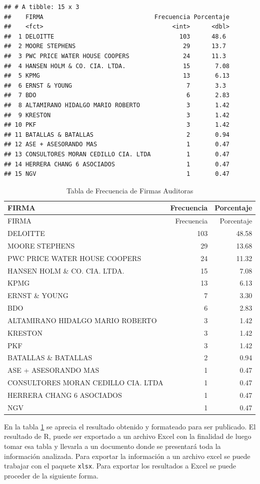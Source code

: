 \documentclass[]{book}
\begin{document}
\begin{verbatim}
## # A tibble: 15 x 3
##    FIRMA                               Frecuencia Porcentaje
##    <fct>                                    <int>      <dbl>
##  1 DELOITTE                                   103      48.6 
##  2 MOORE STEPHENS                              29      13.7 
##  3 PWC PRICE WATER HOUSE COOPERS               24      11.3 
##  4 HANSEN HOLM & CO. CIA. LTDA.                15       7.08
##  5 KPMG                                        13       6.13
##  6 ERNST & YOUNG                                7       3.3 
##  7 BDO                                          6       2.83
##  8 ALTAMIRANO HIDALGO MARIO ROBERTO             3       1.42
##  9 KRESTON                                      3       1.42
## 10 PKF                                          3       1.42
## 11 BATALLAS & BATALLAS                          2       0.94
## 12 ASE + ASESORANDO MAS                         1       0.47
## 13 CONSULTORES MORAN CEDILLO CIA. LTDA          1       0.47
## 14 HERRERA CHANG 6 ASOCIADOS                    1       0.47
## 15 NGV                                          1       0.47
\end{verbatim}

\begin{longtable}[]{@{}lrr@{}}
\caption{\label{tab:tabla2}Tabla de Frecuencia de Firmas Auditoras}\tabularnewline
\toprule
FIRMA & Frecuencia & Porcentaje\tabularnewline
\midrule
\endfirsthead
\toprule
FIRMA & Frecuencia & Porcentaje\tabularnewline
\midrule
\endhead
DELOITTE & 103 & 48.58\tabularnewline
MOORE STEPHENS & 29 & 13.68\tabularnewline
PWC PRICE WATER HOUSE COOPERS & 24 & 11.32\tabularnewline
HANSEN HOLM \& CO. CIA. LTDA. & 15 & 7.08\tabularnewline
KPMG & 13 & 6.13\tabularnewline
ERNST \& YOUNG & 7 & 3.30\tabularnewline
BDO & 6 & 2.83\tabularnewline
ALTAMIRANO HIDALGO MARIO ROBERTO & 3 & 1.42\tabularnewline
KRESTON & 3 & 1.42\tabularnewline
PKF & 3 & 1.42\tabularnewline
BATALLAS \& BATALLAS & 2 & 0.94\tabularnewline
ASE + ASESORANDO MAS & 1 & 0.47\tabularnewline
CONSULTORES MORAN CEDILLO CIA. LTDA & 1 & 0.47\tabularnewline
HERRERA CHANG 6 ASOCIADOS & 1 & 0.47\tabularnewline
NGV & 1 & 0.47\tabularnewline
\bottomrule
\end{longtable}

En la tabla \ref{tab:tabla2} se aprecia el resultado obtenido y formateado para ser publicado. El resultado de R, puede ser exportado a un archivo Excel con la finalidad de luego tomar esa tabla y llevarla a un documento donde se presentará toda la información analizada. Para exportar la información a un archivo excel se puede trabajar con el paquete \texttt{xlsx}. Para exportar los resultados a Excel se puede proceder de la siguiente forma.
\end{document}
